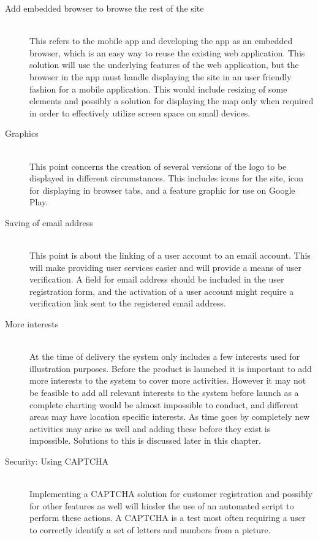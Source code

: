 \begin{description}
  \item[Add embedded browser to browse the rest of the site] \hfill \\ This refers to the mobile app and developing the app as an embedded browser, which is an easy way to reuse the existing web application. This solution will use the underlying features of the web application, but the browser in the app must handle displaying the site in an user friendly fashion for a mobile application. This would include resizing of some elements and possibly a solution for displaying the map only when required in order to effectively utilize screen space on small devices.
  \item[Graphics] \hfill \\ This point concerns the creation of several versions of the logo to be displayed in different circumstances. This includes icons for the site, icon for displaying in browser tabs, and a feature graphic for use on Google Play.
  \item[Saving of email address] \hfill \\ This point is about the linking of a user account to an email account. This will make providing user services easier and will provide a means of user verification. A field for email address should be included in the user registration form, and the activation of a user account might require a verification link sent to the registered email address.
  \item[More interests] \hfill \\ At the time of delivery the system only includes a few interests used for illustration purposes. Before the product is launched it is important to add more interests to the system to cover more activities. However it may not be feasible to add all relevant interests to the system before launch as a complete charting would be almost impossible to conduct, and different areas may have location specific interests. As time goes by completely new activities may arise as well and adding these before they exist is impossible. Solutions to this is discussed later in this chapter.
  \item[Security: Using CAPTCHA] \hfill \\ Implementing a CAPTCHA solution for customer registration and possibly for other features as well will hinder the use of an automated script to perform these actions. A CAPTCHA is a test most often requiring a user to correctly identify a set of letters and numbers from a picture.

\end{description}
